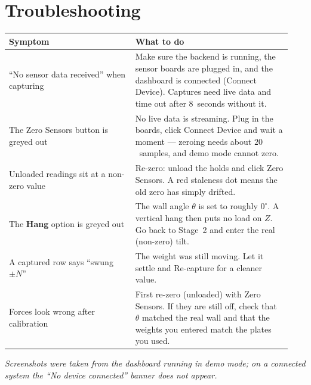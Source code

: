 \documentclass[11pt,a4paper]{article}
\begin{document}
\section{Troubleshooting}

\begin{center}
\begin{tabular}{@{}p{0.42\linewidth}p{0.52\linewidth}@{}}
\toprule
\textbf{Symptom} & \textbf{What to do} \\
\midrule
``No sensor data received'' when capturing &
Make sure the backend is running, the sensor boards are plugged in, and the
dashboard is connected (\textsf{Connect Device}). Captures need live data and time
out after 8~seconds without it. \\[4pt]
The \textsf{Zero Sensors} button is greyed out &
No live data is streaming. Plug in the boards, click \textsf{Connect Device} and
wait a moment --- zeroing needs about $20$~samples, and demo mode cannot zero. \\[4pt]
Unloaded readings sit at a non-zero value &
Re-zero: unload the holds and click \textsf{Zero Sensors}. A red staleness dot means
the old zero has simply drifted. \\[4pt]
The \textbf{Hang} option is greyed out &
The wall angle $\theta$ is set to roughly $0^\circ$. A vertical hang then puts no
load on $Z$. Go back to Stage~2 and enter the real (non-zero) tilt. \\[4pt]
A captured row says ``swung $\pm N$'' &
The weight was still moving. Let it settle and \textsf{Re-capture} for a cleaner
value. \\[4pt]
Forces look wrong after calibration &
First re-zero (unloaded) with \textsf{Zero Sensors}. If they are still off, check
that $\theta$ matched the real wall and that the weights you entered match the
plates you used. \\
\bottomrule
\end{tabular}
\end{center}

\vfill
\begin{center}\small\itshape\color{muted}
Screenshots were taken from the dashboard running in demo mode; on a connected
system the ``No device connected'' banner does not appear.
\end{center}
\end{document}
